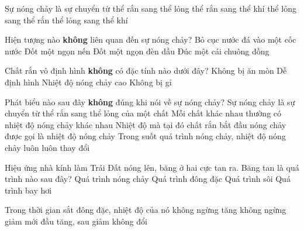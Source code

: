 \begin{ex}
	Sự nóng chảy là sự chuyển từ	
	\choice
	{\True thể rắn sang thể lỏng}
	{thể rắn sang thể khí}
	{thể lỏng sang thể rắn}
	{thể lỏng sang thể khí}
	\end{ex}
\begin{ex}
	Hiện tượng nào \textbf{không} liên quan đến sự nóng chảy?
	\choice
	{Bỏ cục nước đá vào một cốc nước}
	{Đốt một ngọn nến}
	{\True Đốt một ngọn đèn dầu}
	{Đúc một cái chuông đồng}
	\end{ex}
\begin{ex}%
	Chất rắn vô định hình \textbf{không} có đặc tính nào dưới đây?
	\choice
	{Không bị ăn mòn}
	{Dễ định hình}
	{\True Nhiệt độ nóng chảy cao}
	{Không bị gỉ}
	\end{ex}
\begin{ex}
	Phát biểu nào sau đây \textbf{không} đúng khi nói về sự nóng chảy?
	\choice
	{Sự nóng chảy là sự chuyển từ thể rắn sang thể lỏng của một chất}
	{Mỗi chất khác nhau thường có nhiệt độ nóng chảy khác nhau}
	{Nhiệt độ mà tại đó chất rắn bắt đầu nóng chảy được gọi là nhiệt độ nóng chảy}
	{\True Trong suốt quá trình nóng chảy, nhiệt độ nóng chảy luôn luôn thay đổi}
	\end{ex}
\begin{ex}
	Hiệu ứng nhà kính làm Trái Đất nóng lên, băng ở hai cực tan ra. Băng tan là quá trình nào sau đây?
	\choice
	{\True Quá trình nóng chảy}
	{Quá trình đông đặc}
	{Quá trình sôi}
	{Quá trình bay hơi}
	\end{ex}
\begin{ex}
	Trong thời gian sắt đông đặc, nhiệt độ của nó
	\choice
	{không ngừng tăng}
	{không ngừng giảm}
	{mới đầu tăng, sau giảm}
	{\True không đổi}
	\loigiai{
		
	}
	\end{ex}
